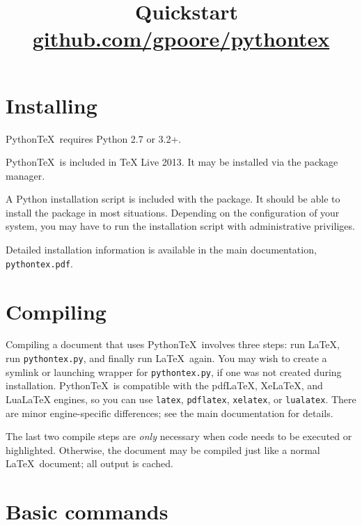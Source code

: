 \documentclass[twocolumn]{article}
\title{\vspace{-0.6in} \pytex\ Quickstart \\ {\normalsize \href{https://github.com/gpoore/pythontex}{github.com/gpoore/pythontex}}}
\author{}
\date{}
\newcommand{\pytex}{Python\TeX}
\begin{document}
\maketitle




\section*{Installing}

\pytex\ requires Python 2.7 or 3.2+.

\pytex\ is included in TeX Live 2013.  It may be installed via the package manager.

A Python installation script is included with the package.  It should be able to install the package in most situations.  Depending on the configuration of your system, you may have to run the installation script with administrative priviliges.

Detailed installation information is available in the main documentation, \texttt{pythontex.pdf}.

\section*{Compiling}

Compiling a document that uses \pytex\ involves three steps:  run \LaTeX, run \texttt{pythontex.py}, and finally run \LaTeX\ again.  You may wish to create a symlink or launching wrapper for \texttt{pythontex.py}, if one was not created during installation.  \pytex\ is compatible with the pdfLaTeX, XeLaTeX, and LuaLaTeX engines, so you can use \texttt{latex}, \texttt{pdflatex}, \texttt{xelatex}, or \texttt{lualatex}.  There are minor engine-specific differences; see the main documentation for details.

The last two compile steps are \emph{only} necessary when code needs to be executed or highlighted.  Otherwise, the document may be compiled just like a normal \LaTeX\ document; all output is cached.




\section*{Basic commands}
\end{document}
